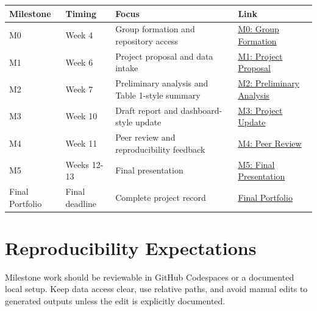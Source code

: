 \documentclass[
  letterpaper,
  DIV=11,
  numbers=noendperiod,
  oneside]{scrreprt}
\begin{document}
\begin{longtable}[]{@{}
  >{\raggedright\arraybackslash}p{}
  >{\raggedright\arraybackslash}p{}
  >{\raggedright\arraybackslash}p{}
  >{\raggedright\arraybackslash}p{}@{}}
\toprule\noalign{}
\begin{minipage}[b]{\linewidth}\raggedright
Milestone
\end{minipage} & \begin{minipage}[b]{\linewidth}\raggedright
Timing
\end{minipage} & \begin{minipage}[b]{\linewidth}\raggedright
Focus
\end{minipage} & \begin{minipage}[b]{\linewidth}\raggedright
Link
\end{minipage} \\
\midrule\noalign{}
\endhead
\bottomrule\noalign{}
\endlastfoot
M0 & Week 4 & Group formation and repository access &
\href{m0-group-formation/README.md}{M0: Group Formation} \\
M1 & Week 6 & Project proposal and data intake &
\href{m1-proposal/README.md}{M1: Project Proposal} \\
M2 & Week 7 & Preliminary analysis and Table 1-style summary &
\href{m2-preliminary-analysis/README.md}{M2: Preliminary Analysis} \\
M3 & Week 10 & Draft report and dashboard-style update &
\href{m3-project-update/README.md}{M3: Project Update} \\
M4 & Week 11 & Peer review and reproducibility feedback &
\href{m4-peer-review/README.md}{M4: Peer Review} \\
M5 & Weeks 12-13 & Final presentation &
\href{m5-presentation/README.md}{M5: Final Presentation} \\
Final Portfolio & Final deadline & Complete project record &
\href{final-portfolio/README.md}{Final Portfolio} \\
\end{longtable}

\section{Reproducibility
Expectations}\label{reproducibility-expectations-1}

Milestone work should be reviewable in GitHub Codespaces or a documented
local setup. Keep data access clear, use relative paths, and avoid
manual edits to generated outputs unless the edit is explicitly
documented.
\end{document}
